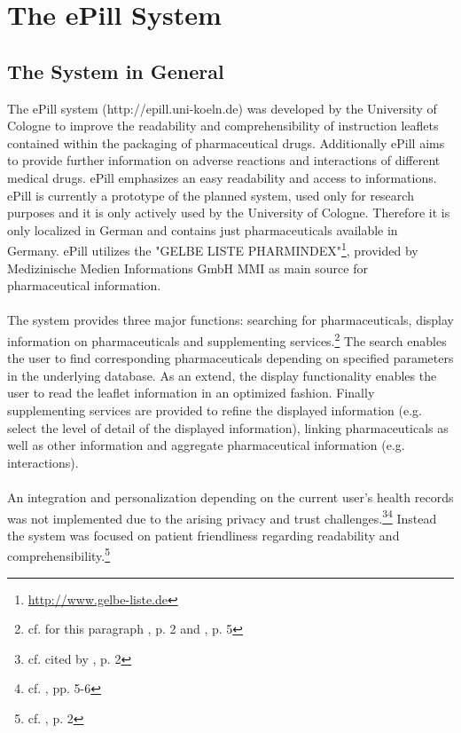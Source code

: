 \section{The ePill System}
\subsection{The System in General}
The ePill system (http://epill.uni-koeln.de) was developed by the University of Cologne to improve the readability and comprehensibility of instruction leaflets contained within the packaging of pharmaceutical drugs. Additionally ePill aims to provide further information on adverse reactions and interactions of different medical drugs. ePill emphasizes an easy readability and access to informations.
\\
ePill is currently a prototype of the planned system, used only for research purposes and it is only actively used by the University of Cologne. Therefore it is only localized in German and contains just pharmaceuticals available in Germany. ePill utilizes the "GELBE LISTE PHARMINDEX"\footnote{\url{http://www.gelbe-liste.de}}, provided by Medizinische Medien Informations GmbH MMI as main source for pharmaceutical information.
\\
\\
The system provides three major functions: searching for pharmaceuticals, display information on pharmaceuticals and supplementing services.\footnote{cf. for this paragraph \cite{Dehling.2012}, p. 2 and \cite{Dehling.2012b}, p. 5} The search enables the user to find corresponding pharmaceuticals depending on specified parameters in the underlying database. As an extend, the display functionality enables the user to read the leaflet information in an optimized fashion. Finally supplementing services are provided to refine the displayed information (e.g. select the level of detail of the displayed information), linking pharmaceuticals as well as other information and aggregate pharmaceutical information (e.g. interactions). 
\\
\\
An integration and personalization depending on the current user's health records was not implemented due to the arising privacy and trust challenges.\footnote{cf. \cite{Kaletsch.2011} cited by \cite{Dehling.2012}, p. 2}\footnote{cf. \cite{Kaletsch.2011}, pp. 5-6} Instead the system was focused on patient friendliness regarding readability and comprehensibility.\footnote{cf. \cite{Dehling.2012b}, p. 2}
\\
